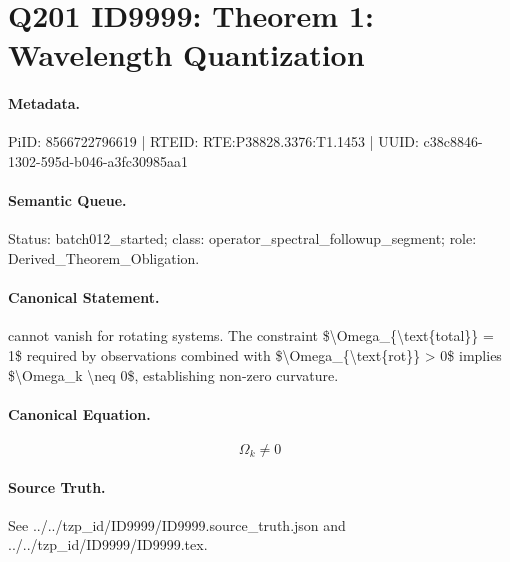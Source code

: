 \section*{Q201 ID9999: Theorem 1: Wavelength Quantization}
\paragraph{Metadata.}
PiID: 8566722796619 | RTEID: RTE:P38828.3376:T1.1453 | UUID: c38c8846-1302-595d-b046-a3fc30985aa1

\paragraph{Semantic Queue.}
Status: batch012\_started; class: operator\_spectral\_followup\_segment; role: Derived\_Theorem\_Obligation.

\paragraph{Canonical Statement.}
cannot vanish for rotating systems. The constraint \$\textbackslash{}Omega\_\{\textbackslash{}text\{total\}\} = 1\$ required by observations combined with \$\textbackslash{}Omega\_\{\textbackslash{}text\{rot\}\} > 0\$ implies \$\textbackslash{}Omega\_k \textbackslash{}neq 0\$, establishing non-zero curvature.

\paragraph{Canonical Equation.}
\[
\Omega_k \neq 0
\]

\paragraph{Source Truth.}
See ../../tzp\_id/ID9999/ID9999.source\_truth.json and ../../tzp\_id/ID9999/ID9999.tex.
